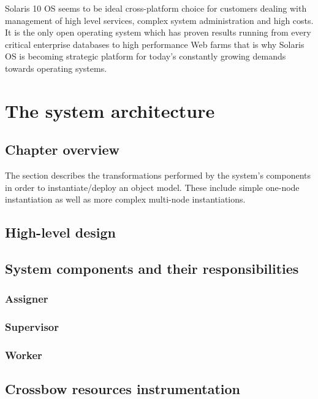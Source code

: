 \documentclass[11pt]{book}
\begin{document}
      Solaris 10 OS seems to be ideal cross-platform choice for customers dealing with management of high level
      services, complex system administration and high costs. It is the only open operating system which has
      proven results running from every critical enterprise databases to high performance Web farms that is
      why Solaris OS is becoming strategic platform for today's constantly growing demands towards operating
      systems. 


  \chapter{The system architecture}

    \section*{Chapter overview}

      The  section describes the transformations performed by the system's components in order
      to instantiate/deploy an object model. These include simple one-node instantiation as well as more complex
      multi-node instantiations.



    \section{High-level design}


    \section{System components and their responsibilities}

      \subsection{Assigner}

      \subsection{Supervisor}

      \subsection{Worker}


    \section{Crossbow resources instrumentation}
\end{document}
